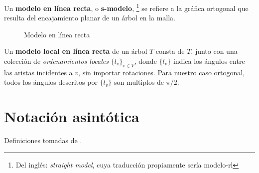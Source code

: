 \begin{definition}
Un \textbf{modelo en l\'inea recta}\cite{minbends}, o \textbf{s-modelo}, \footnote{Del ingl\'es: \textit{straight model}, cuya traducci\'on propiamente ser\'ia modelo-rl} se refiere a la gr\'afica ortogonal que resulta del encajamiento planar de un \'arbol en la malla.
\end{definition}

\begin{figure}
  \caption{Modelo en l\'inea recta}
\end{figure}

\begin{definition}
Un \textbf{modelo local en l\'inea recta}\cite{paper} de un \'arbol $T$ consta de $T$, junto con una colecci\'on de \emph{ordenamientos locales} $\{l_v\}_{v\in V}$, donde $\{l_v\}$ indica los \'angulos entre las aristas incidentes a $v$, sin importar rotaciones. Para nuestro caso ortogonal, todos los \'angulos descritos por $\{l_v\}$ son multiplos de $\pi/2$.
\end{definition}

\section{Notaci\'on asint\'otica}

Definiciones tomadas de \cite{cormenetal}.

